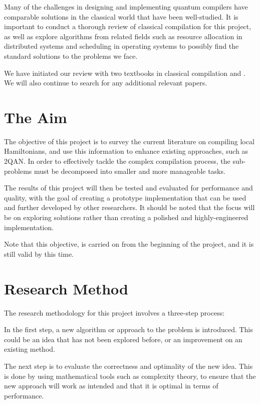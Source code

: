 \documentclass{article}
\begin{document}
Many of the challenges in designing and implementing quantum compilers have comparable solutions in the classical world that have been well-studied. It is important to conduct a thorough review of classical compilation for this project, as well as explore algorithms from related fields such as resource allocation in distributed systems and scheduling in operating systems to possibly find the standard solutions to the problems we face.

We have initiated our review with two textbooks in classical compilation \cite{aho1986} and \cite{allen2001}. We will also continue to search for any additional relevant papers.

\printbibliography[heading=none,keyword=classical]

\section{The Aim}

The objective of this project is to survey the current literature on compiling local Hamiltonians, and use this information to enhance existing approaches, such as 2QAN. In order to effectively tackle the complex compilation process, the sub-problems must be decomposed into smaller and more manageable tasks.

The results of this project will then be tested and evaluated for performance and quality, with the goal of creating a prototype implementation that can be used and further developed by other researchers. It should be noted that the focus will be on exploring solutions rather than creating a polished and highly-engineered implementation.

Note that this objective, is carried on from the beginning of the project, and it is still valid by this time.

\section{Research Method}
The research methodology for this project involves a three-step process: 

In the first step, a new algorithm or approach to the problem is introduced. This could be an idea that has not been explored before, or an improvement on an existing method.

The next step is to evaluate the correctness and optimality of the new idea. This is done by using mathematical tools such as complexity theory, to ensure that the new approach will work as intended and that it is optimal in terms of performance.
\end{document}
